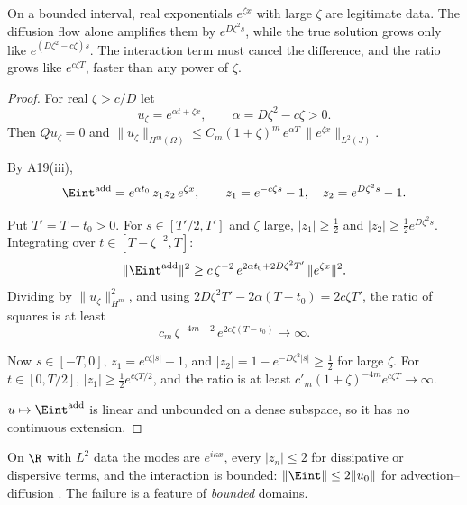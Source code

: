 \begin{proofidea}
On a bounded interval, real exponentials $e^{\zeta x}$ with large $\zeta$ are legitimate data. The diffusion flow alone amplifies them by $e^{D\zeta^2s}$, while the true solution grows only like $e^{(D\zeta^2-c\zeta)s}$. The interaction term must cancel the difference, and the ratio grows like $e^{c\zeta T}$, faster than any power of $\zeta$.
\end{proofidea}

\begin{proof}
For real $\zeta>c/D$ let
\[
u_\zeta=e^{\alpha t+\zeta x},\qquad \alpha=D\zeta^2-c\zeta>0 .
\]
Then $Qu_\zeta=0$ and $\|u_\zeta\|_{H^m(\Omega)}\le C_m(1+\zeta)^m\,e^{\alpha T}\,\|e^{\zeta x}\|_{L^2(J)}$.

By A19(iii),
\[
\Eint^{\mathrm{add}}=e^{\alpha t_0}\,z_1z_2\,e^{\zeta x},\qquad z_1=e^{-c\zeta s}-1,\quad z_2=e^{D\zeta^2s}-1 .
\]

Put $T'=T-t_0>0$. For $s\in[T'/2,T']$ and $\zeta$ large, $|z_1|\ge\tfrac12$ and $|z_2|\ge\tfrac12e^{D\zeta^2s}$. Integrating over $t\in[T-\zeta^{-2},T]$:
\[
\|\Eint^{\mathrm{add}}\|^2\ge c\,\zeta^{-2}\,e^{2\alpha t_0+2D\zeta^2T'}\,\|e^{\zeta x}\|^2 .
\]
Dividing by $\|u_\zeta\|_{H^m}^2$, and using $2D\zeta^2T'-2\alpha(T-t_0)=2c\zeta T'$, the ratio of squares is at least
\[
c_m\,\zeta^{-4m-2}\,e^{2c\zeta(T-t_0)}\longrightarrow\infty .
\]

Now $s\in[-T,0]$, $z_1=e^{c\zeta|s|}-1$, and $|z_2|=1-e^{-D\zeta^2|s|}\ge\tfrac12$ for large $\zeta$. For $t\in[0,T/2]$, $|z_1|\ge\tfrac12e^{c\zeta T/2}$, and the ratio is at least $c'_m(1+\zeta)^{-4m}e^{c\zeta T}\to\infty$.

$u\mapsto\Eint^{\mathrm{add}}$ is linear and unbounded on a dense subspace, so it has no continuous extension.

\end{proof}

\begin{caution}[title={Where this does not happen}]
On $\R$ with $L^2$ data the modes are $e^{i\kappa x}$, every $|z_n|\le2$ for dissipative or dispersive terms, and the interaction is bounded: $\|\Eint\|\le2\|u_0\|$ for advection--diffusion . The failure is a feature of \emph{bounded} domains.
\end{caution}

